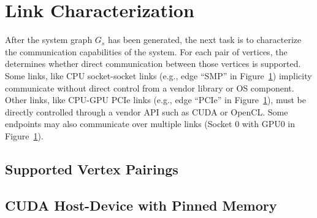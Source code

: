 %
%
\section{Link Characterization}
\label{sec:link-char}

After the system graph $G_s$ has been generated, the next task is to characterize the communication capabilities of the system.
For each pair of vertices, the  determines whether direct communication between those vertices is supported.
Some links, like CPU socket-socket links (e.g., edge ``SMP'' in Figure~\ref{fig:simple-topology}) implicity communicate without direct control from a vendor library or OS component.
Other links, like CPU-GPU PCIe links (e.g., edge ``PCIe'' in Figure~\ref{fig:simple-topology}), must be directly controlled through a vendor API such as CUDA or OpenCL.
Some endpoints may also communicate over multiple links (Socket 0 with GPU0 in Figure~\ref{fig:simple-topology}).

\begin{figure}
    \centering
    \caption[A simple example topology]{}
    \label{fig:simple-topology}
\end{figure}

\subsection{Supported Vertex Pairings}

\subsection{CUDA Host-Device with Pinned Memory}

